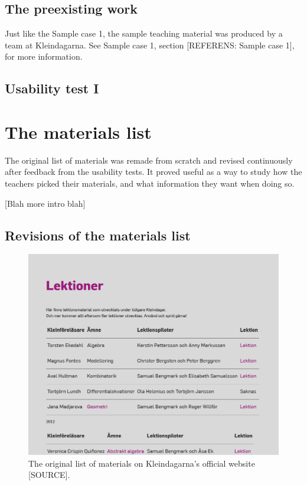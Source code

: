 \subsection{The preexisting work}

Just like the Sample case 1, the sample teaching material was produced by a team at Kleindagarna. See Sample case 1, section [REFERENS: Sample case 1], for more information.

\subsection{Usability test I}



\section{The materials list}

The original list of materials was remade from scratch and revised continuously after feedback from the usability tests. It proved useful as a way to study how the teachers picked their materials, and what information they want when doing so.

[Blah more intro blah]

\subsection{Revisions of the materials list}

\begin{figure}[H]
\centering
\includegraphics[width=\linewidth]{figure/screenshot_materiallista_kleindagarna.png}
\caption{The original list of materials on Kleindagarna's official website [SOURCE].}
\end{figure}

